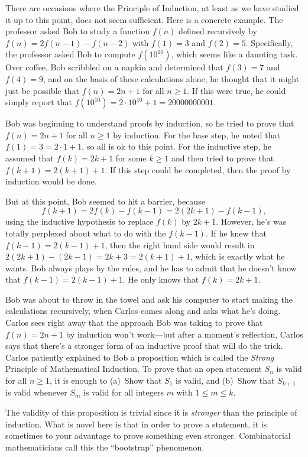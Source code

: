 There are occasions where the Principle of Induction, at least
as we have studied it up to this point, does not seem sufficient.
Here is a concrete example.
The professor asked Bob to study a function  $f(n)$ defined recursively by
$f(n) = 2f(n-1) - f(n-2)$ with $f(1)=3$ and $f(2)=5$.  Specifically,
the professor asked Bob to compute $f(10^{10})$, which seems like 
a daunting task.  Over coffee, Bob scribbled on a napkin and determined
that $f(3)=7$ and $f(4)=9$, and on the basis of these calculations alone,
he thought that it might just be possible that  
$f(n) = 2n+1$ for all $n\geq 1$.  If this were true, he could
simply report that $f(10^{10})=2\cdot 10^{10}+1=20000000001$.

Bob was beginning to understand proofs by induction, so he tried to
prove that $f(n)=2n+1$ for all $n\ge1$ by induction. For the base step,
he noted that $f(1)= 3=2\cdot1+1$, so all is ok to this point.
For the inductive step, he assumed that $f(k)=2k+1$ for some $k\ge1$
and then tried to prove that $f(k+1)=2(k+1)+1$.  If this step could be completed,
then the proof by induction would be done.

But at this point, Bob seemed to hit a barrier, because 
\[f(k+1) = 2f(k) - f(k-1) = 2(2k+1) - f(k-1),
\]
using the inductive hypothesis to replace $f(k)$ by $2k+1$. However,
he's was totally perplexed about what to do with the $f(k-1)$.  If he knew
that $f(k-1)=2(k-1)+1$, then the right hand side
would result in $2(2k+1) -(2k-1)= 2k+3=2(k+1)+1$, which is
exactly what he wants.  Bob always plays by the rules, and he
has to admit that he doesn't know that $f(k-1)=2(k-1)+1$.  He
only knows that $f(k)=2k+1$.

Bob was about to throw in the towel and ask his computer to start
making the calculations recursively, when
Carlos comes along and asks what he's doing. Carlos sees right away
that the approach Bob was taking to prove that $f(n)=2n+1$ by induction
won't work---but after a moment's reflection, Carlos says that there's
a stronger form of an inductive proof that will do the trick.
Carlos patiently explained to Bob a proposition which is called the
\textit{Strong} Principle of Mathematical Induction.  To prove that
an open statement $S_n$ is valid for all $n\ge1$, it is enough to
(a)~Show that $S_1$ is valid, and (b)~Show that $S_{k+1}$ is valid
whenever $S_m$ is valid for all integers $m$ with $1\le m\le k$.

The validity of this proposition is trivial since it is \textit{stronger}
than the principle of induction.  What is novel here is that in order
to prove a statement, it is sometimes to your advantage to prove
something even stronger.  Combinatorial mathematicians call this
the ``bootstrap'' phenomenon.

